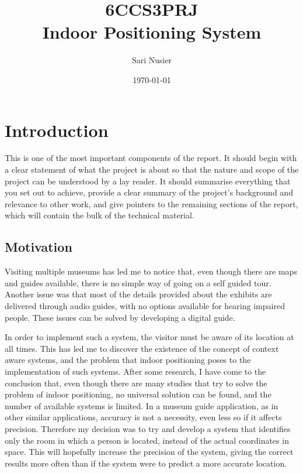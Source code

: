 \documentclass[12pt]{informatics-report}
\title{6CCS3PRJ\\\vspace{0.2cm}Indoor Positioning System}
\author{Sari Nusier}
\date{\today}
\begin{document}
\createFrontMatter
\onehalfspacing
\tableofcontents
\doublespacing


\chapter{Introduction}
This is one of the most important components of the report. It should begin with a clear statement of what the project is about so that the nature and scope of the project can be understood by a lay reader. It should summarise everything that you set out to achieve, provide a clear summary of the project's background and relevance to other work, and give pointers to the remaining sections of the report, which will contain the bulk of the technical material.

\section{Motivation}
Visiting multiple museums has led me to notice that, even though there are maps and guides available, there is no simple way of going on a self guided tour. Another issue was that most of the details provided about the exhibits are delivered through audio guides, with no options available for hearing impaired people. These issues can be solved by developing a digital guide.

In order to implement such a system, the visitor must be aware of its location at all times. This has led me to discover the existence of the concept of context aware systems, and the problem that indoor positioning poses to the implementation of such systems. After some research, I have come to the conclusion that, even though there are many studies that try to solve the problem of indoor positioning, no universal solution can be found, and the number of available systems is limited. In a museum guide application, as in other similar applications, accuracy is not a necessity, even less so if it affects precision. Therefore my decision was to try and develop a system that identifies only the room in which a person is located, instead of the actual coordinates in space. This will hopefully increase the precision of the system, giving the correct results more often than if the system were to predict a more accurate location.
\end{document}
